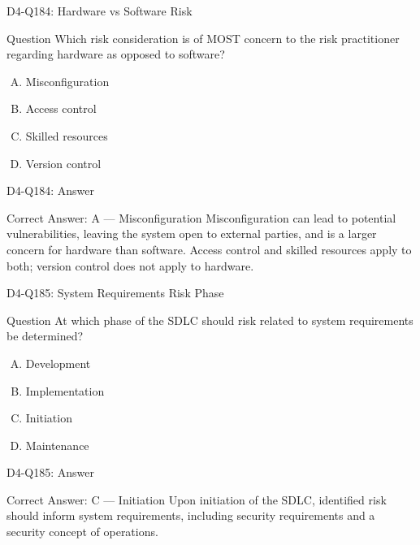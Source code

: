 \documentclass{beamer}
\begin{document}
	\begin{frame}{D4-Q184: Hardware vs Software Risk}
		\begin{block}{Question}
			Which risk consideration is of MOST concern to the risk practitioner regarding hardware as opposed to software?
		\end{block}
		\begin{enumerate}[(A)]
			\item Misconfiguration
			\item Access control
			\item Skilled resources
			\item Version control
		\end{enumerate}
	\end{frame}
	\begin{frame}{D4-Q184: Answer}
		\begin{block}{Correct Answer: A --- Misconfiguration}
			Misconfiguration can lead to potential vulnerabilities, leaving the system open to external parties, and is a larger concern for hardware than software. Access control and skilled resources apply to both; version control does not apply to hardware.
		\end{block}
	\end{frame}
	
	\begin{frame}{D4-Q185: System Requirements Risk Phase}
		\begin{block}{Question}
			At which phase of the SDLC should risk related to system requirements be determined?
		\end{block}
		\begin{enumerate}[(A)]
			\item Development
			\item Implementation
			\item Initiation
			\item Maintenance
		\end{enumerate}
	\end{frame}
	\begin{frame}{D4-Q185: Answer}
		\begin{block}{Correct Answer: C --- Initiation}
			Upon initiation of the SDLC, identified risk should inform system requirements, including security requirements and a security concept of operations.
		\end{block}
	\end{frame}
	
\end{document}
